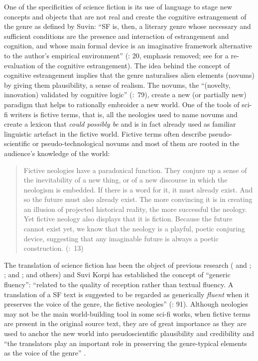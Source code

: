 \documentclass[output=paper]{langscibook}
\begin{document}
One of the specificities of science fiction is its use of language to stage new concepts and objects that are not real and create the cognitive estrangement of the genre as defined by Suvin: “SF is, then, a literary genre whose necessary and sufficient conditions are the presence and interaction of estrangement and cognition, and whose main formal device is an imaginative framework alternative to the author’s empirical environment” (\citealt{Suvin2016}: 20, emphasis removed; see \citealt{Spiegel2008} for a re-evaluation of the cognitive estrangement). The idea behind the concept of cognitive estrangement implies that the genre naturalises alien elements (novums) by giving them plausibility, a sense of realism. The novums, the “(novelty, innovation) validated by cognitive logic” (\citealt{Suvin2016}:~79), create a new (or partially new) paradigm that helps to rationally embroider a new world. One of the tools of sci-fi writers is fictive terms, that is, all the neologies used to name novums and create a lexicon that \textit{could possibly be} and is in fact already used as familiar linguistic artefact in the fictive world. Fictive terms often describe pseudo-scientific or pseudo-technological novums and most of them are rooted in the audience’s knowledge of the world:

\begin{quote}
Fictive neologies have a paradoxical function. They conjure up a sense of the inevitability of a new thing, or of a new discourse in which the neologism is embedded. If there is a word for it, it must already exist. And so the future must also already exist. The more convincing it is in creating an illusion of projected historical reality, the more successful the neology. Yet fictive neology also displays that it is fiction. Because the future cannot exist yet, we know that the neology is a playful, poetic conjuring device, suggesting that any imaginable future is always a poetic construction. (\citealt{csicsery-ronay_seven_2008}:~13)
\end{quote}

The translation of science fiction has been the object of previous research (\citealt{Gouanvic1997} and \citealt{Gouanvic1999}; \citealt{Wozniak2014}; \citealt{Ray2019a} and \citealt{Ray2019b}; \citealt{Campbell2021} and others) and Suvi Korpi has established the concept of “generic fluency”: “related to the quality of reception rather than textual fluency. A translation of a SF text is suggested to be regarded as generically \textit{fluent} when it preserves the voice of the genre, the fictive neologies” (\citealt{Korpi2021}: 91). Although neologies may not be the main world-building tool in some sci-fi works, when fictive terms are present in the original source text, they are of great importance as they are used to anchor the new world into pseudoscientific plausibility and credibility and “the translators play an important role in preserving the genre-typical elements as the voice of the genre” \citep[88]{Korpi2017}.
\end{document}

